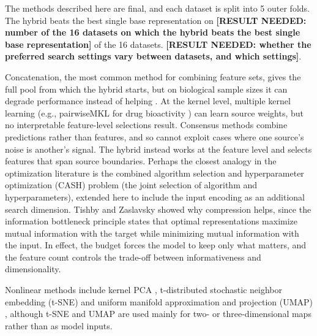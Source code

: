 
The methods described here are final, and each dataset is split into 5 outer folds. The hybrid beats the best single base representation on \textbf{[RESULT NEEDED: number of the 16 datasets on which the hybrid beats the best single base representation]} of the 16 datasets. \textbf{[RESULT NEEDED: whether the preferred search settings vary between datasets, and which settings]}.

Concatenation, the most common method for combining feature sets, gives the full pool from which the hybrid starts, but on biological sample sizes it can degrade performance instead of helping \citep{Bellman1961, Stahlschmidt2022}. At the kernel level, multiple kernel learning \citep{Gonen2011} (e.g., pairwiseMKL for drug bioactivity \citep{Cichonska2018}) can learn source weights, but no interpretable feature-level selections result. Consensus methods \citep{Valsecchi2020} combine predictions rather than features, and so cannot exploit cases where one source's noise is another's signal. The hybrid instead works at the feature level and selects features that span source boundaries. Perhaps the closest analogy in the optimization literature is the combined algorithm selection and hyperparameter optimization (CASH) problem \citep{Thornton2013} (the joint selection of algorithm and hyperparameters), extended here to include the input encoding as an additional search dimension. Tishby and Zaslavsky \citep{Tishby2015} showed why compression helps, since the information bottleneck principle states that optimal representations maximize mutual information with the target while minimizing mutual information with the input. In effect, the budget forces the model to keep only what matters, and the feature count controls the trade-off between informativeness and dimensionality.

Nonlinear methods include kernel PCA \citep{Niazi2023}, t-distributed stochastic neighbor embedding (t-SNE) \citep{vanderMaaten2008} and uniform manifold approximation and projection (UMAP) \citep{McInnes2018}, although t-SNE and UMAP are used mainly for two- or three-dimensional maps rather than as model inputs.

